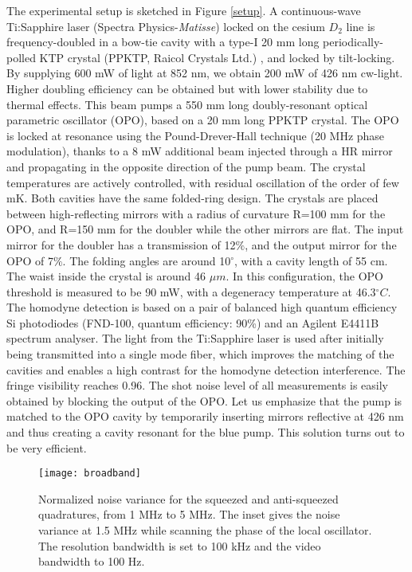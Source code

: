 The experimental setup is sketched in Figure
\ref{setup}. A continuous-wave
Ti:Sapphire laser (Spectra Physics-\textit{Matisse}) locked on the cesium $D_2$ line is frequency-doubled  in a bow-tie cavity with
a type-I 20 mm long periodically-polled KTP crystal (PPKTP, Raicol Crystals Ltd.) \cite{LKB1}, and locked by tilt-locking\cite{tilt}. By supplying 600 mW of light at 852 nm, we obtain 200 mW of 426 nm cw-light. Higher doubling efficiency can be obtained but with lower stability due to thermal effects. This beam pumps a 550 mm long doubly-resonant optical parametric oscillator (OPO), based on
a 20 mm long PPKTP crystal. The OPO is locked at resonance using the Pound-Drever-Hall technique \cite{PDH} (20 MHz phase modulation), thanks to a 8 mW additional beam injected through a HR mirror and propagating in the opposite direction of the pump beam. The crystal temperatures are
actively controlled, with residual oscillation of the order of few mK. Both cavities have the same folded-ring design. The crystals are placed between high-reflecting mirrors with a radius of curvature R=100 mm for the OPO, and R=150 mm for the doubler while the other mirrors are flat. The input mirror for the doubler has a transmission of 12$\%$, and the output mirror for the OPO of 7$\%$.  The folding angles are around 10$^{\circ}$, with a cavity length of 55 cm. The waist inside the crystal is around 46 $\mu m$. In this configuration, the OPO threshold is measured to be 90 mW, with a degeneracy temperature at 46.3$^{\circ}C$.  The homodyne detection is based on a pair of balanced high quantum efficiency Si photodiodes (FND-100, quantum efficiency: 90\%) and an Agilent E4411B spectrum analyser. The light from the Ti:Sapphire laser is used after initially being transmitted into a single mode fiber, which improves the matching of the cavities and enables a high contrast for the homodyne detection interference. The fringe visibility
reaches 0.96. The shot noise level of all measurements is easily
obtained by blocking the output of the OPO. Let us emphasize that the pump is matched to the OPO cavity by temporarily inserting mirrors reflective at 426 nm and thus creating a cavity resonant for the blue pump. This solution turns out to be very efficient. 


\begin{figure}[t!]
\begin{center}
\texttt{[image: broadband]}
\end{center}
\caption{Normalized noise variance for the squeezed and anti-squeezed quadratures, from 1 MHz to 5 MHz. The inset gives the noise variance at 1.5 MHz while scanning the phase of the local oscillator. The resolution bandwidth is set to 100 kHz and the video bandwidth to 100
Hz. 
}\label{broad}
\end{figure}

